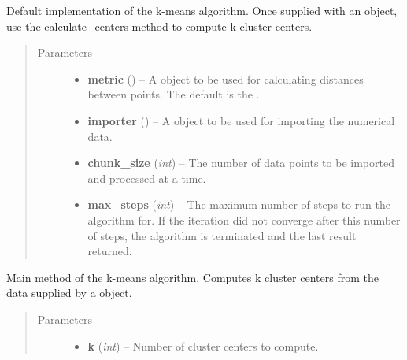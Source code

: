 \documentclass[letterpaper,10pt,english]{sphinxmanual}
\begin{document}
\begin{fulllineitems}
\label{kmeans:kmeans.DefaultKmeans}
Default implementation of the k-means algorithm. Once supplied with an {\hyperref[common:common_data_importer.CommonDataImporter]{}} object, use the
calculate\_centers method to compute k cluster centers.
\begin{quote}\begin{description}
\item[{Parameters}] \leavevmode\begin{itemize}
\item {} 
\textbf{metric} () -- A  object to be used for calculating distances between points. The default is
the .

\item {} 
\textbf{importer} ({\hyperref[common:common_data_importer.CommonDataImporter]{}}) -- A {\hyperref[common:common_data_importer.CommonDataImporter]{}} object to be used for importing the numerical data.

\item {} 
\textbf{chunk\_size} (\emph{int}) -- The number of data points to be imported and processed at a time.

\item {} 
\textbf{max\_steps} (\emph{int}) -- The maximum number of steps to run the algorithm for. If the iteration did not converge after
this number of steps, the algorithm is terminated and the last result returned.

\end{itemize}

\end{description}\end{quote}

\begin{fulllineitems}
\label{kmeans:kmeans.DefaultKmeans.calculate_centers}
Main method of the k-means algorithm. Computes k cluster centers from the data supplied by a
{\hyperref[common:common_data_importer.CommonDataImporter]{}} object.
\begin{quote}\begin{description}
\item[{Parameters}] \leavevmode\begin{itemize}
\item {} 
\textbf{k} (\emph{int}) -- Number of cluster centers to compute.


\end{itemize}
\end{description}
\end{quote}
\end{fulllineitems}
\end{fulllineitems}
\end{document}
